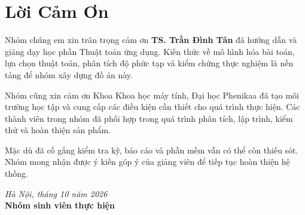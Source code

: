 \chapter*{Lời Cảm Ơn}

Nhóm chúng em xin trân trọng cảm ơn \textbf{TS. Trần Đình Tân} đã hướng dẫn và
giảng dạy học phần Thuật toán ứng dụng. Kiến thức về mô hình hóa bài toán, lựa
chọn thuật toán, phân tích độ phức tạp và kiểm chứng thực nghiệm là nền tảng để
nhóm xây dựng đồ án này.

Nhóm cũng xin cảm ơn Khoa Khoa học máy tính, Đại học Phenikaa đã tạo môi
trường học tập và cung cấp các điều kiện cần thiết cho quá trình thực hiện. Các
thành viên trong nhóm đã phối hợp trong quá trình phân tích, lập trình, kiểm thử
và hoàn thiện sản phẩm.

Mặc dù đã cố gắng kiểm tra kỹ, báo cáo và phần mềm vẫn có thể còn thiếu sót.
Nhóm mong nhận được ý kiến góp ý của giảng viên để tiếp tục hoàn thiện hệ thống.

\begin{flushright}
\textit{Hà Nội, tháng 10 năm 2026}\\[0.5cm]
\textbf{Nhóm sinh viên thực hiện}
\end{flushright}
\clearpage
